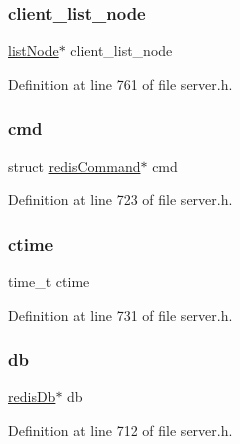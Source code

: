 \mbox{\label{structclient_ad8a3896d9632f4ec77839688f457611b}} 
\subsubsection{\texorpdfstring{client\+\_\+list\+\_\+node}{client\_list\_node}}
{\footnotesize\ttfamily \hyperlink{structlist_node}{list\+Node}$\ast$ client\+\_\+list\+\_\+node}



Definition at line 761 of file server.\+h.

\mbox{\label{structclient_a8ed6c4d0c6382ad1787b32d10db25c5e}} 
\subsubsection{\texorpdfstring{cmd}{cmd}}
{\footnotesize\ttfamily struct \hyperlink{structredis_command}{redis\+Command}$\ast$ cmd}



Definition at line 723 of file server.\+h.

\mbox{\label{structclient_a2b105009c2d9020cbaf51d4457c20e3d}} 
\subsubsection{\texorpdfstring{ctime}{ctime}}
{\footnotesize\ttfamily time\+\_\+t ctime}



Definition at line 731 of file server.\+h.

\mbox{\label{structclient_a9bee04e09635a42fef289e42a89f5502}} 
\subsubsection{\texorpdfstring{db}{db}}
{\footnotesize\ttfamily \hyperlink{structredis_db}{redis\+Db}$\ast$ db}



Definition at line 712 of file server.\+h.

